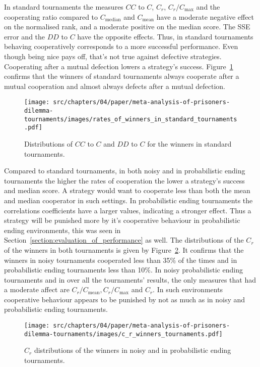 In standard tournaments the measures  $CC$ to $C$, $C_r$, $C_r / C_{\text{max}}$
and the cooperating ratio compared to $C_{\text{median}}$ and $C_{\text{mean}}$
have a moderate negative effect on the normalised rank, and a moderate positive
on the median score. The SSE error and the $DD$ to $C$ have the opposite
effects. Thus, in standard tournaments behaving cooperatively corresponds to a
more successful performance. Even though being nice pays off,
that's not true against defective strategies. Cooperating after a mutual
defection lowers a strategy's success.
Figure~\ref{fig:rates_of_winners_in_standard_tournaments} confirms that the
winners of standard tournaments always cooperate after a mutual cooperation and
almost always defects after a mutual defection.

\begin{figure}[!htbp]
    \centering
    \texttt{[image: src/chapters/04/paper/meta-analysis-of-prisoners-dilemma-tournaments/images/rates\_of\_winners\_in\_standard\_tournaments.pdf]}
    \caption{Distributions of $CC$ to $C$ and $DD$ to $C$ for the winners in
    standard tournaments.}\label{fig:rates_of_winners_in_standard_tournaments}
\end{figure}

Compared to standard tournaments, in both noisy and in probabilistic ending
tournaments the higher the rates of cooperation the lower a strategy's success
and median score. A strategy would want to cooperate less than both
the mean and median cooperator in such settings. In probabilistic ending
tournaments the correlations coefficients have a larger values, indicating a
stronger effect. Thus a strategy will be punished more by it's cooperative
behaviour in probabilistic ending environments, this was seen in Section~\ref{section:evaluation_of_performance}
as well. The distributions of the $C_r$ of the winners in
both tournaments is given by Figure~\ref{fig:c_r_distributions}. It confirms
that the winners in noisy tournaments cooperated less than 35\% of the times
and in probabilistic ending tournaments less than 10\%.
In noisy probabilistic ending tournaments and in over all the tournaments' results,
the only measures that had a moderate affect are $C_r/C_{\text{mean}},
C_r/C_{\text{max}}$ and $C_r$. In such environments cooperative behaviour
appears to be punished by not as much as in noisy and probabilistic ending
tournaments.

\begin{figure}[!htbp]
    \centering
    \texttt{[image: src/chapters/04/paper/meta-analysis-of-prisoners-dilemma-tournaments/images/c\_r\_winners\_tournaments.pdf]}
    \caption{$C_r$ distributions of the winners in noisy and in probabilistic
    ending tournaments.}\label{fig:c_r_distributions}
\end{figure}

